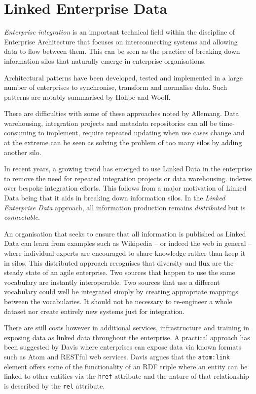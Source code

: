 \section{Linked Enterprise Data}
\label{linked-enterprise-data}

\emph{Enterprise integration} is an important technical field within the
discipline of Enterprise Architecture that focuses on interconnecting
systems and allowing data to flow between them. This can be seen as
the practice of breaking down information silos that naturally emerge
in enterprise organisations.\cite{allemang2010semantic}

Architectural patterns have been developed, tested and
implemented in a large number of enterprises to synchronise,
transform and normalise data. Such patterns are notably
summarised by Hohpe and Woolf.\cite{hohpe2004enterprise}

There are difficulties with some of these approaches noted by
Allemang\cite{allemang2010semantic}. Data warehousing,
integration projects and metadata repositories can all
be time-consuming to implement, require repeated updating when
use cases change and at the extreme can be seen as solving the
problem of too many silos by adding another silo.

In recent years, a growing trend has emerged to use
Linked Data in the enterprise to remove the need
for repeated integration projects or data warehousing.
indexes over bespoke integration efforts. This follows from
a major motivation of Linked Data being that it aids in breaking
down information silos. \cite{bizer2009linked} In the
\emph{Linked Enterprise Data} approach, all information
production remains \emph{distributed} but is
\emph{connectable}.\cite{allemang2010semantic}

An organisation that seeks to ensure that all information is
published as Linked Data can learn from examples such as Wikipedia
-- or indeed the web in general -- where individual experts are
encouraged to share knowledge rather than keep it in silos. This
distributed approach recognises that diversity and flux are the
steady state of an agile enterprise. Two sources that happen
to use the same vocabulary are instantly interoperable. Two
sources that use a different vocabulary could well be integrated
simply by creating appropriate mappings between the vocabularies.
It should not be necessary to re-engineer a whole dataset nor
create entirely new systems just for integration.

There are still costs however in additional services, infrastructure
and training in exposing data as linked data throughout the
enterprise.\cite{hyland2010preparing} A practical approach
has been suggested by Davis\cite{davis2011achieving} where enterprises
can expose data via known formats such as Atom\cite{nottingham2005atom}
and RESTful web services. Davis argues that the \texttt{atom:link}
element offers some of the functionality of an RDF triple where
an entity can be linked to other entities via the \texttt{href}
attribute and the nature of that relationship is described by
the \texttt{rel} attribute.

